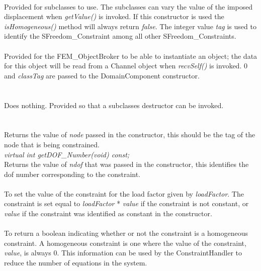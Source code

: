  \\
Provided for subclasses to use. The subclasses can vary the value of the
imposed displacement when {\em getValue()} is invoked. If this
constructor is used the {\em isHomogeneous()} method will always
return {\em false}. The integer value {\em tag} is used to identify
the SFreedom\_Constraint among all other SFreedom\_Constraints. \\


 \\
Provided for the FEM\_ObjectBroker to be able to instantiate an
object; the data for this object will be read from a Channel object
when {\em recvSelf()} is invoked. $0$ and {\em classTag} are passed to
the DomainComponent constructor. \\


  \\
 \\
Does nothing. Provided so that a subclasses destructor can be
invoked. \\


  \\
 \\
Returns the value of {\em node} passed in the constructor, this should be 
the tag of the node that is being constrained. \\

{\em virtual int getDOF\_Number(void) const;} \\
Returns the value of {\em ndof} that was passed in the constructor,
this identifies the dof number corresponding to the constraint. \\

\\ 
To set the value of the constraint for the load factor given by {\em
loadFactor}. The constraint is set equal to {\em loadFactor} * {\em
value} if the constraint is not constant, or {\em value} if the
constraint was identified as constant in the constructor. \\

\\
To return a boolean indicating whether or not the constraint is a
homogeneous constraint. A homogeneous constraint is one where the value
of the constraint, {\em value}, is always $0$. This information can be used by the
ConstraintHandler to reduce the number of equations in the system. \\

